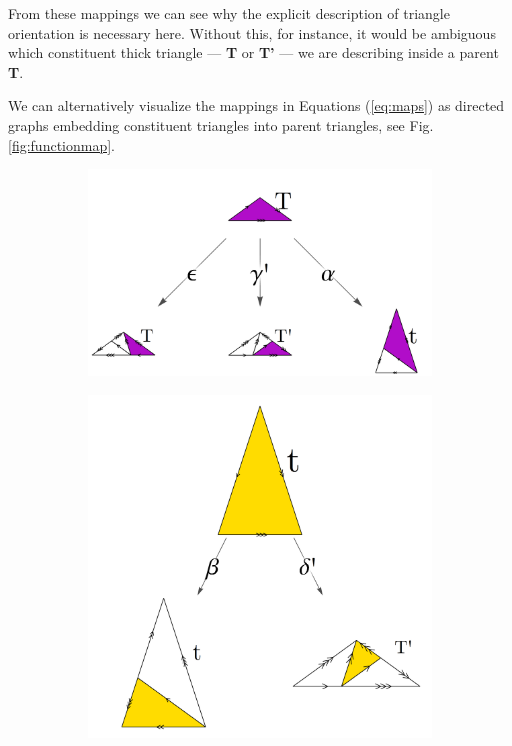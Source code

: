 \documentclass[
  oneside,
  11pt, a4paper,
  footinclude=true,
  headinclude=true,
  cleardoublepage=empty
]{scrbook}
\begin{document}
From these mappings we can see why the explicit description of triangle orientation is necessary here. Without this, for instance, it would be ambiguous which constituent thick triangle --- \textbf{T} or \textbf{T'} --- we are describing inside a parent \textbf{T}.

We can alternatively visualize the mappings in Equations (\ref{eq:maps}) as directed graphs embedding constituent triangles into parent triangles, see Fig.\ref{fig:functionmap}. 

\begin{figure}[H]
        \begin{subfigure}[t]{0.6\textwidth}
                \includegraphics[width=\textwidth]{TRgraph}
        \end{subfigure}\hfill
        \begin{subfigure}[t]{0.4\textwidth}
                \includegraphics[width=\textwidth]{tsrgraph}
        \end{subfigure}\\
        

\end{figure}
\end{document}

